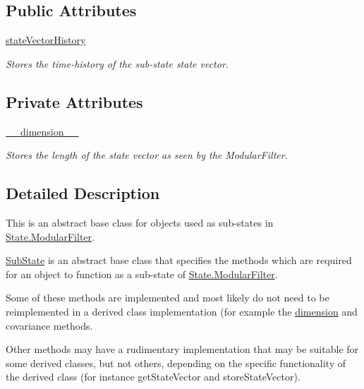\subsection*{Public Attributes}
\begin{DoxyCompactItemize}
\item 
\hyperlink{classSubStates_1_1SubState_a24bf2de56fc3037d91cba43d28f3bf60}{state\+Vector\+History}
\begin{DoxyCompactList}\small\item\em Stores the time-\/history of the sub-\/state state vector. \end{DoxyCompactList}\end{DoxyCompactItemize}
\subsection*{Private Attributes}
\begin{DoxyCompactItemize}
\item 
\hyperlink{classSubStates_1_1SubState_aea750997b2a75daee4a3147eac68e4f8}{\+\_\+\+\_\+dimension\+\_\+\+\_\+}
\begin{DoxyCompactList}\small\item\em Stores the length of the state vector as seen by the Modular\+Filter. \end{DoxyCompactList}\end{DoxyCompactItemize}


\subsection{Detailed Description}
This is an abstract base class for objects used as sub-\/states in \hyperlink{classState_1_1ModularFilter}{State.\+Modular\+Filter}. 

\hyperlink{classSubStates_1_1SubState}{Sub\+State} is an abstract base class that specifies the methods which are required for an object to function as a sub-\/state of \hyperlink{classState_1_1ModularFilter}{State.\+Modular\+Filter}.

Some of these methods are implemented and most likely do not need to be reimplemented in a derived class implementation (for example the \hyperlink{classSubStates_1_1SubState_a4aebea19a134cb871a7c0b6c2709546a}{dimension} and covariance methods.

Other methods may have a rudimentary implementation that may be suitable for some derived classes, but not others, depending on the specific functionality of the derived class (for instance get\+State\+Vector and store\+State\+Vector).

